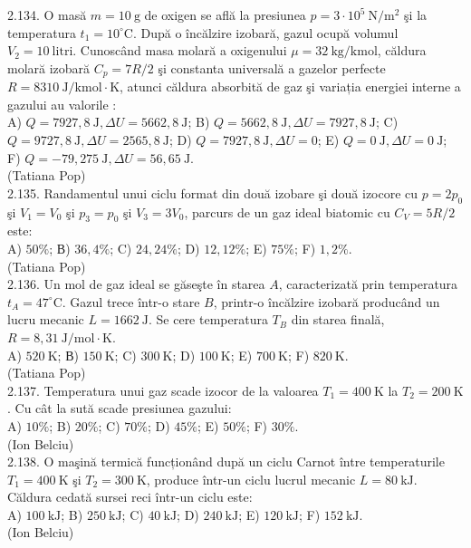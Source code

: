 2.134. O masă $m=10 \mathrm{~g}$ de oxigen se află la presiunea $p=3 \cdot 10^{5} \mathrm{~N} / \mathrm{m}^{2}$ şi la temperatura $t_{1}=10^{\circ} \mathrm{C}$. După o încălzire izobară, gazul ocupă volumul $V_{2}=10 \mathrm{~litri}$. Cunoscând masa molară a oxigenului $\mu=32 \mathrm{~kg} / \mathrm{kmol}$, căldura molară izobară $C_{p}=7 R / 2$ şi constanta universală a gazelor perfecte $R=8310 \mathrm{~J} / \mathrm{kmol} \cdot \mathrm{K}$, atunci căldura absorbită de gaz şi variația energiei interne a gazului au valorile :\\ A) $Q=7927,8 \mathrm{~J}, \Delta U=5662,8 \mathrm{~J}$; B) $Q=5662,8 \mathrm{~J}, \Delta U=7927,8 \mathrm{~J}$; C) $Q=9727,8 \mathrm{~J}, \Delta U=2565,8 \mathrm{~J}$; D) $Q=7927,8 \mathrm{~J}, \Delta U=0$; E) $Q=0 \mathrm{~J}, \Delta U=0 \mathrm{~J}$; F) $Q=-79,275 \mathrm{~J}, \Delta U=56,65 \mathrm{~J}$.\\ (Tatiana Pop)\\

2.135. Randamentul unui ciclu format din două izobare şi două izocore cu $p=2 p_{0}$ şi $V_{1}=V_{0}$ şi $p_{3}=p_{0}$ şi $V_{3}=3 V_{0}$, parcurs de un gaz ideal biatomic cu $C_{V}=5 R / 2$ este:\\ A) $50 \%$; В) $36,4 \%$; C) $24,24 \%$; D) $12,12 \%$; E) $75 \%$; F) $1,2 \%$.\\ (Tatiana Pop)\\

2.136. Un mol de gaz ideal se găseşte în starea $A$, caracterizată prin temperatura $t_{A}=47^{\circ} \mathrm{C}$. Gazul trece într-o stare $B$, printr-o încălzire izobară producând un lucru mecanic $L=1662 \mathrm{~J}$. Se cere temperatura $T_{B}$ din starea finală, $R=8,31 \mathrm{~J} / \mathrm{mol} \cdot \mathrm{K}$.\\ A) $520 \mathrm{~K}$; В) $150 \mathrm{~K}$; C) $300 \mathrm{~K}$; D) $100 \mathrm{~K}$; E) $700 \mathrm{~K}$; F) $820 \mathrm{~K}$.\\ (Tatiana Pop)\\

2.137. Temperatura unui gaz scade izocor de la valoarea $T_{1}=400 \mathrm{~K}$ la $T_{2}=200 \mathrm{~K}$. Cu cât la sută scade presiunea gazului:\\ A) $10 \%$; B) $20 \%$; C) $70 \%$; D) $45 \%$; E) $50 \%$; F) $30 \%$.\\ (Ion Belciu)\\

2.138. O maşină termică funcționând după un ciclu Carnot între temperaturile $T_{1}=400 \mathrm{~K}$ şi $T_{2}=300 \mathrm{~K}$, produce într-un ciclu lucrul mecanic $L=80 \mathrm{~kJ}$. Căldura cedată sursei reci într-un ciclu este:\\ A) $100 \mathrm{~kJ}$; B) $250 \mathrm{~kJ}$; C) $40 \mathrm{~kJ}$; D) $240 \mathrm{~kJ}$; E) $120 \mathrm{~kJ}$; F) $152 \mathrm{~kJ}$.\\ (Ion Belciu)\\

